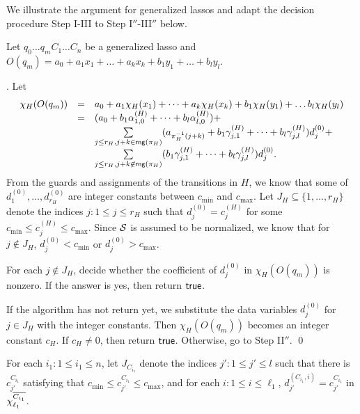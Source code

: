 \begin{appendix}
We illustrate the argument for generalized lassos and adapt the decision procedure Step I-III to Step I$''$-III$''$ below.

Let $q_0 \dots q_m C_1 \dots C_n$ be a generalized lasso and $O(q_m)=a_0 + a_1 x_1 + \dots + a_k x_k + b_1 y_1 + \dots + b_l y_l$.

\smallskip

. Let
\[
\begin{array}{l c l }
\chi_H(O(q_m)) & = & a_0 + a_1 \chi_H(x_1) + \dots + a_k \chi_H(x_k) + b_1 \chi_H(y_1) + \dots b_l \chi_H(y_l) \\
& = & (a_0+b_1 \alpha^{(H)}_{1,0} + \dots + b_l \alpha^{(H)}_{l,0}) + \\
& & \sum \limits_{j \le r_H, j+k \in \mathsf{rng}(\pi_H)} (a_{\pi_H^{-1}(j+k)}+ b_1 \gamma^{(H)}_{j,1}+\dots + b_l \gamma^{(H)}_{j,l}) d^{(0)}_j +
\\
& & \sum \limits_{j \le r_H, j +k \not \in \mathsf{rng}(\pi_H)}  (b_1 \gamma^{(H)}_{j,1}+\dots + b_l \gamma^{(H)}_{j,l}) d^{(0)}_j .
\end{array}
\]
From the guards and assignments of the transitions in $H$, we know that some of $d^{(0)}_1,\dots,d^{(0)}_{r_H}$ are integer constants between $c_{\min}$ and $c_{\max}$. Let $J_H \subseteq \{1,\dots, r_H\}$ denote the indices $j: 1 \le j \le r_H$ such that $d^{(0)}_j = c^{(H)}_j$ for some $c_{\min}\le c^{(H)}_j \le c_{\max}$. Since ${\mathcal{S} }$ is assumed to be normalized, we know that for $j \not \in J_H$,  $d^{(0)}_j < c_{\min}$ or $d^{(0)}_j > c_{\max}$.

For each $j \not \in J_H$, decide whether the coefficient of $d^{(0)}_j$ in $\chi_H(O(q_m))$ is nonzero. If the answer is yes, then return $\mathsf{true}$. 

If the algorithm has not return yet, we substitute the data variables $d^{(0)}_j$ for $j \in J_H$ with the integer constants. Then $\chi_H(O(q_m))$ becomes an integer constant $c_H$. If $c_H \neq 0$, then return $\mathsf{true}$.  Otherwise, go to Step II$''$. \qed

\medskip

For each $i_1: 1 \le i_1 \le n$, let $J_{C_{i_1}}$ denote the indices $j': 1 \le j' \le l$ such that there is $c^{C_{i_1}}_{j'}$ satisfying that $c_{\min} \le c^{C_{i_1}}_{j'} \le c_{\max}$, and for each $i: 1 \le i \le \ell_1$, $d^{(C_{i_1},i)}_{j'}=c^{C_{i_1}}_{j'}$ in $\chi^{\overline{C_{i_1}}}_{\ell_1}$. 


\end{appendix}
